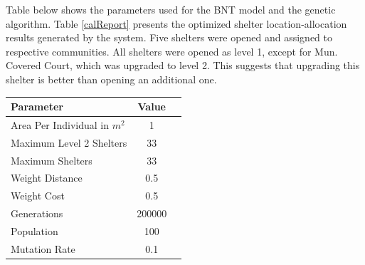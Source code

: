 	Table below shows the parameters used for the BNT model and the genetic algorithm. Table \ref{calReport} presents the optimized shelter location-allocation results generated by the system. Five shelters were opened and assigned to respective communities. All shelters were opened as level 1, except for Mun. Covered Court, which was upgraded to level 2. This suggests that upgrading this shelter is better than opening an additional one.
	
	\begin{table}[h!]
		\renewcommand{\arraystretch}{1.2} 
		\centering
		\begin{tabular}{p{13cm}cc}
			\hline
			\textbf{Parameter} & \textbf{Value} \\ \hline
			Area Per Individual in $m^2$ & 1 \\ 
			Maximum Level 2 Shelters  & 33 \\ 
			Maximum Shelters & 33 \\ 
			Weight Distance & 0.5 \\ 
			Weight Cost & 0.5 \\ 
			Generations & 200000 \\ 
			Population & 100 \\ 
			Mutation Rate & 0.1 \\ \hline
		\end{tabular}
	\end{table}
	
